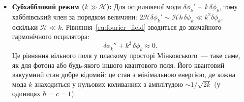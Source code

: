 \documentclass[12pt, a4paper]{article}
\begin{document}
\begin{itemize}
  \item \textbf{Субхаббловий режим ($k \gg \mathcal{H}$):}
        Для осцилюючої моди $\delta\phi_k' \sim k\,\delta\phi_k$,
        тому хабблівський член за порядком величини:
        $2\mathcal{H}\delta\phi_k' \sim \mathcal{H}k\,\delta\phi_k
        \ll k^2\delta\phi_k$,
        оскільки $\mathcal{H} \ll k$.
        Рівняння~\eqref{eq:fourier_field} зводиться до звичайного
        гармонічного осцилятора:
        \begin{equation*}
          \delta\phi_k'' + k^2\,\delta\phi_k \approx 0.
        \end{equation*}
        Це рівняння вільного поля у пласкому просторі Мінковського~---
        таке саме, як для фотона або будь-якого іншого квантового поля.
        Його квантовий вакуумний стан добре відомий: це стан з мінімальною
        енергією, де кожна мода $k$ знаходиться у нульових коливаннях з
        амплітудою $\sim 1/\sqrt{2k}$ (у одиницях $\hbar = c = 1$).


\end{itemize}
\end{document}
